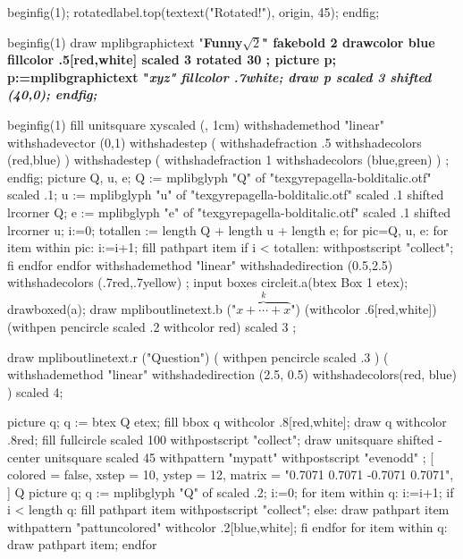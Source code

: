   beginfig(1);
    rotatedlabel.top(textext("Rotated!"), origin, 45);
  endfig;
\endmplibcode
\par
\mplibcode
beginfig(1) %
draw mplibgraphictext "\bf Funny$\sqrt{2}$"
  fakebold 2 %
  drawcolor blue fillcolor .5[red,white]
  scaled 3 rotated 30 ;
picture p;
p:=mplibgraphictext "\it xyz"
  fillcolor .7white;
draw p scaled 3 shifted (40,0);
endfig;
\endmplibcode
\par
{}%
\mplibcode
beginfig(1)
fill unitsquare xyscaled (\mpdim\hsize, 1cm)
    withshademethod "linear"
    withshadevector (0,1)
    withshadestep (
       withshadefraction .5
       withshadecolors (red,blue)
    )
    withshadestep (
       withshadefraction 1
       withshadecolors (blue,green)
    )
    ;
endfig;
\endmplibcode
\leavevmode
\mpfig
picture Q, u, e;
Q := mplibglyph "Q" of "texgyrepagella-bolditalic.otf" scaled .1;
u := mplibglyph "u" of "texgyrepagella-bolditalic.otf" scaled .1 shifted lrcorner Q;
e := mplibglyph "e" of "texgyrepagella-bolditalic.otf" scaled .1 shifted lrcorner u;
i:=0;
totallen := length Q + length u + length e;
for pic=Q, u, e:
  for item within pic:
    i:=i+1;
    fill pathpart item
    if i < totallen: withpostscript "collect"; fi
  endfor
endfor
  withshademethod "linear"
  withshadedirection (0.5,2.5)
  withshadecolors (.7red,.7yellow)
  ;
\endmpfig
{}%
\mpfig* input boxes \endmpfig
\mpfig circleit.a(btex Box 1 etex); drawboxed(a); \endmpfig
\def\mpfiginstancename{mympfig}%
\mpfig
draw mpliboutlinetext.b ("$\overbrace{x+\cdots+x}^k$")
    (withcolor .6[red,white])
    (withpen pencircle scaled .2 withcolor red)
    scaled 3 ;
\endmpfig
\par
\mpfig
  draw mpliboutlinetext.r
    ("Question")
    ( withpen pencircle scaled .3 )
    (
      withshademethod "linear"
      withshadedirection (2.5, 0.5)
      withshadecolors(red, blue)
    )
    scaled 4;
\endmpfig
\par\leavevmode
{}
  \mpfig
    picture q;
    q := btex Q etex;
    fill bbox q withcolor .8[red,white];
    draw q withcolor .8red;
  \endmpfig
\endmppattern
\mpfig
  fill fullcircle scaled 100 withpostscript "collect";
  draw unitsquare shifted - center unitsquare scaled 45
    withpattern "mypatt"
    withpostscript "evenodd"
    ;
\endmpfig
{}
  [
    colored = false,
    xstep = 10,
    ystep = 12,
    matrix = "0.7071 0.7071 -0.7071 0.7071",
  ]
  Q%
\endmppattern
\mpfig
  picture q;
  q := mplibglyph "Q" of \fontid\font scaled .2;
  i:=0;
  for item within q:
    i:=i+1;
    if i < length q:
      fill pathpart item withpostscript "collect";
    else:
      draw pathpart item withpattern "pattuncolored"
        withcolor .2[blue,white];
    fi
  endfor
  for item within q: draw pathpart item; endfor
\endmpfig
{}

